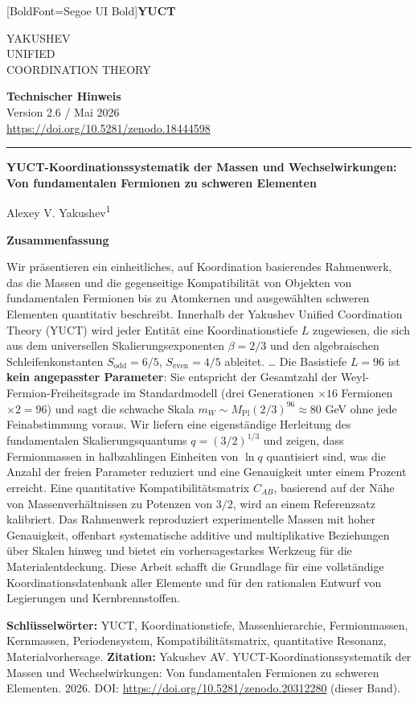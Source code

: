 \documentclass[11pt,a4paper]{article}
\newcommand{\makeheader}{%
	\noindent
	\begin{minipage}{0.17\textwidth}
		\raggedright
		{\fontspec{Segoe UI}[BoldFont=Segoe UI Bold]\bfseries\color{skyblue}\fontsize{46}{46}\selectfont YUCT}%
	\end{minipage}%
	\hspace{30pt}
	\begin{minipage}{0.32\textwidth}
		\raggedright
		{\sffamily\fontsize{11}{13}\selectfont YAKUSHEV\\ UNIFIED\\ COORDINATION THEORY}%
	\end{minipage}%
	\hfill
	\begin{minipage}{0.38\textwidth}
		\raggedleft
		{\sffamily\bfseries Technischer Hinweis}\\ 
		{\sffamily Version 2.6 / Mai 2026}\\ 
		{\sffamily\footnotesize \url{https://doi.org/10.5281/zenodo.18444598}}%
	\end{minipage}
	\par\vspace{5pt}
	\noindent\textcolor{gold}{\rule{\textwidth}{1.6pt}}
	\par\vspace{0pt}
}
\begin{document}
	\thispagestyle{firstpage}
	\makeheader
	
	\vspace{0cm}
	{\LARGE\bfseries YUCT-Koordinationssystematik der Massen und Wechselwirkungen:\\ 
		\Large Von fundamentalen Fermionen zu schweren Elementen \par}
	\vspace{0.2cm}
	
	{\large Alexey V. Yakushev\textsuperscript{1}} \\
	\vspace{0.0cm}
	
	{\color{darkblue}\textbf{\LARGE Zusammenfassung}} \par
	{\large
		\noindent
		Wir präsentieren ein einheitliches, auf Koordination basierendes Rahmenwerk, das die Massen und die gegenseitige Kompatibilität von Objekten von fundamentalen Fermionen bis zu Atomkernen und ausgewählten schweren Elementen quantitativ beschreibt. Innerhalb der Yakushev Unified Coordination Theory (YUCT) wird jeder Entität eine Koordinationstiefe \(L\) zugewiesen, die sich aus dem universellen Skalierungsexponenten \(\beta = 2/3\) und den algebraischen Schleifenkonstanten \(S_{\mathrm{odd}}=6/5\), \(S_{\mathrm{even}}=4/5\) ableitet. … Die Basistiefe \(L=96\) ist \textbf{kein angepasster Parameter}: Sie entspricht der Gesamtzahl der Weyl-Fermion-Freiheitsgrade im Standardmodell (drei Generationen $\times 16$ Fermionen $\times 2 = 96$) und sagt die schwache Skala \(m_W \sim M_{\mathrm{Pl}}(2/3)^{96} \approx 80\) GeV ohne jede Feinabstimmung voraus. Wir liefern eine eigenständige Herleitung des fundamentalen Skalierungsquantums \(q = (3/2)^{1/3}\) und zeigen, dass Fermionmassen in halbzahlingen Einheiten von \(\ln q\) quantisiert sind, was die Anzahl der freien Parameter reduziert und eine Genauigkeit unter einem Prozent erreicht. Eine quantitative Kompatibilitätsmatrix \(C_{AB}\), basierend auf der Nähe von Massenverhältnissen zu Potenzen von \(3/2\), wird an einem Referenzsatz kalibriert. Das Rahmenwerk reproduziert experimentelle Massen mit hoher Genauigkeit, offenbart systematische additive und multiplikative Beziehungen über Skalen hinweg und bietet ein vorhersagestarkes Werkzeug für die Materialentdeckung. Diese Arbeit schafft die Grundlage für eine vollständige Koordinationsdatenbank aller Elemente und für den rationalen Entwurf von Legierungen und Kernbrennstoffen.}
	
	\vspace{0.1cm}
	\noindent
	{\color{darkblue}\textbf{Schlüsselwörter:}} YUCT, Koordinationstiefe, Massenhierarchie, Fermionmassen, Kernmassen, Periodensystem, Kompatibilitätsmatrix, quantitative Resonanz, Materialvorhersage.
	\vspace{0.1cm}
	\noindent
	{\color{darkblue}\textbf{Zitation:}} Yakushev AV. YUCT-Koordinationssystematik der Massen und Wechselwirkungen: Von fundamentalen Fermionen zu schweren Elementen. 2026. DOI: \url{https://doi.org/10.5281/zenodo.20312280} (dieser Band).
	
\end{document}
